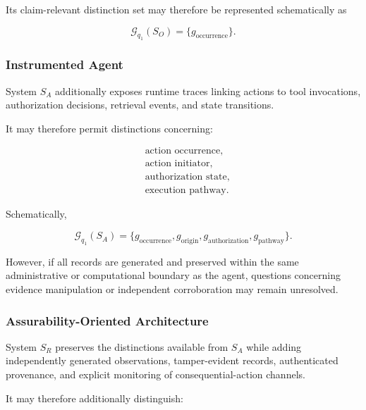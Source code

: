 Its claim-relevant distinction set may therefore be represented
schematically as

\begin{equation}
  \mathcal{G}_{q_1}(S_O)
  =
  \{
  g_{\mathrm{occurrence}}
  \}.
\end{equation}

\subsubsection{Instrumented Agent}

System \(S_A\) additionally exposes runtime traces linking actions to
tool invocations, authorization decisions, retrieval events, and state
transitions.

It may therefore permit distinctions concerning:

\begin{equation}
  \begin{aligned}
     & \text{action occurrence},   \\
     & \text{action initiator},    \\
     & \text{authorization state}, \\
     & \text{execution pathway}.
  \end{aligned}
\end{equation}

Schematically,

\begin{equation}
  \mathcal{G}_{q_1}(S_A)
  =
  \{
  g_{\mathrm{occurrence}},
  g_{\mathrm{origin}},
  g_{\mathrm{authorization}},
  g_{\mathrm{pathway}}
  \}.
\end{equation}

However, if all records are generated and preserved within the same
administrative or computational boundary as the agent, questions
concerning evidence manipulation or independent corroboration may
remain unresolved.

\subsubsection{Assurability-Oriented Architecture}

System \(S_R\) preserves the distinctions available from \(S_A\) while
adding independently generated observations, tamper-evident records,
authenticated provenance, and explicit monitoring of consequential-action
channels.

It may therefore additionally distinguish:

